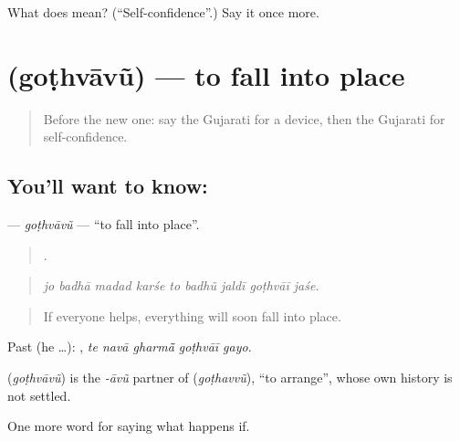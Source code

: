 \begin{tcolorbox}[breakable,colback=teal!4,colframe=teal!35!black,title={Before you move on}]
What does  mean? (\textquotedblleft{}Self-confidence\textquotedblright{}.) Say it once more.
\end{tcolorbox}
\section[\texorpdfstring{\gu{ગોઠવાવું} (goṭhvāvũ)}{ગોઠવાવું (goṭhvāvũ)}]{ (goṭhvāvũ) — to fall into place}

\label{lesson:GU-C392-gothvavu}



\begin{quote}
Before the new one: say the Gujarati for a device, then the Gujarati for self-confidence.
\end{quote}

\subsection*{You'll want to know: }
\textbf{} — \emph{goṭhvāvũ} — \textquotedblleft{}to fall into place\textquotedblright{}.

\begin{quote}
        .
\end{quote}

\begin{quote}
\emph{jo badhā madad karśe to badhũ jaldī goṭhvāī jaśe.}
\end{quote}

\begin{quote}
If everyone helps, everything will soon fall into place.
\end{quote}

Past (he …):     , \emph{te navā gharmā̃ goṭhvāī gayo}.

\begin{cousinweb}
\textbf{} (\emph{goṭhvāvũ}) is the \emph{-āvũ} partner of \textbf{} (\emph{goṭhavvũ}), \textquotedblleft{}to arrange\textquotedblright{}, whose own history is not settled.
\end{cousinweb}

\begin{grammarlens}[title={What you've built}]
One more word for saying what happens if.
\end{grammarlens}

